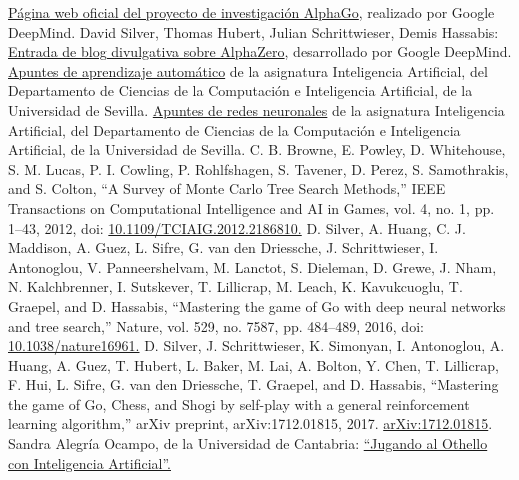 \documentclass[conference,a4paper]{IEEEtran}
\begin{document}
\begin{thebibliography}{00}
 \href{https://deepmind.google/research/projects/alphago/}{Página web oficial del proyecto de investigación AlphaGo}, realizado por Google DeepMind.
 David Silver, Thomas Hubert, Julian Schrittwieser, Demis Hassabis: \href{https://deepmind.google/discover/blog/alphazero-shedding-new-light-on-chess-shogi-and-go/}{Entrada de blog divulgativa sobre AlphaZero}, desarrollado por Google DeepMind.
 \href{https://www.cs.us.es/docencia/aulavirtual/pluginfile.php/9264/mod_resource/content/5/Aprendizaje_automático_%28Contenido_teórico%29.pdf}{Apuntes de aprendizaje automático} de la asignatura Inteligencia Artificial, del Departamento de Ciencias de la Computación e Inteligencia Artificial, de la Universidad de Sevilla.
 \href{https://www.cs.us.es/docencia/aulavirtual/pluginfile.php/9479/mod_resource/content/2/Redes_neuronales_%28Contenido_teórico%29.pdf}{Apuntes de redes neuronales} de la asignatura Inteligencia Artificial, del Departamento de Ciencias de la Computación e Inteligencia Artificial, de la Universidad de Sevilla.
 C. B. Browne, E. Powley, D. Whitehouse, S. M. Lucas, P. I. Cowling, P. Rohlfshagen, S. Tavener, D. Perez, S. Samothrakis, and S. Colton, “A Survey of Monte Carlo Tree Search Methods,” IEEE Transactions on Computational Intelligence and AI in Games, vol. 4, no. 1, pp. 1–43, 2012, doi: \href{https://ieeexplore.ieee.org/document/6145622}{10.1109/TCIAIG.2012.2186810.}
 D. Silver, A. Huang, C. J. Maddison, A. Guez, L. Sifre, G. van den Driessche, J. Schrittwieser, I. Antonoglou, V. Panneershelvam, M. Lanctot, S. Dieleman, D. Grewe, J. Nham, N. Kalchbrenner, I. Sutskever, T. Lillicrap, M. Leach, K. Kavukcuoglu, T. Graepel, and D. Hassabis, “Mastering the game of Go with deep neural networks and tree search,” Nature, vol. 529, no. 7587, pp. 484–489, 2016, doi: \href{https://www.nature.com/articles/nature16961}{10.1038/nature16961.}
 D. Silver, J. Schrittwieser, K. Simonyan, I. Antonoglou, A. Huang, A. Guez, T. Hubert, L. Baker, M. Lai, A. Bolton, Y. Chen, T. Lillicrap, F. Hui, L. Sifre, G. van den Driessche, T. Graepel, and D. Hassabis, “Mastering the game of Go, Chess, and Shogi by self-play with a general reinforcement learning algorithm,” arXiv preprint, arXiv:1712.01815, 2017. \href{https://arxiv.org/abs/1712.01815}{arXiv:1712.01815}.
 Sandra Alegría Ocampo, de la Universidad de Cantabria: \href{https://repositorio.unican.es/xmlui/bitstream/handle/10902/33691/AlegriaOcampoSandra.pdf}{“Jugando al Othello con Inteligencia Artificial”.}

\end{thebibliography}
\end{document}
